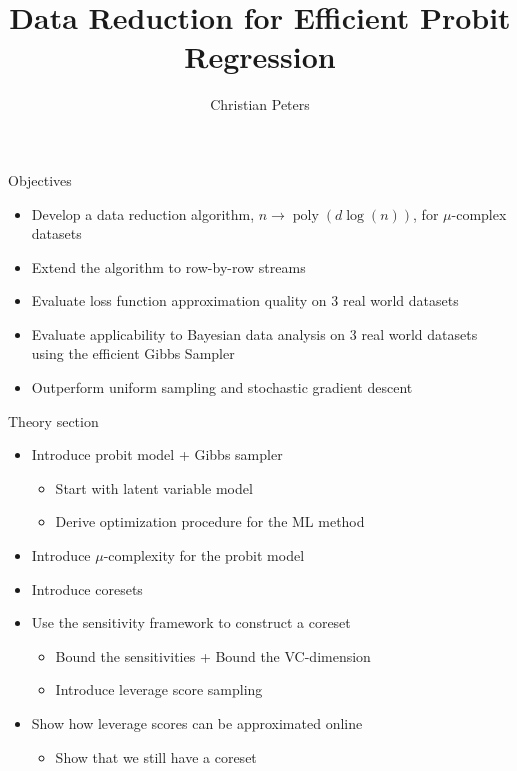 \documentclass[gray]{beamer}
\title{Data Reduction for Efficient Probit Regression}
\author{Christian Peters}
\begin{document}
\maketitle

\begin{frame}{Objectives}
    \begin{itemize}
        \item Develop a data reduction algorithm, $n \rightarrow \operatorname{poly}(d \log(n))$,
              for $\mu$-complex datasets
        \item Extend the algorithm to row-by-row streams
        \item Evaluate loss function approximation quality on 3 real world datasets
        \item Evaluate applicability to Bayesian data analysis on 3 real world datasets
              using the efficient Gibbs Sampler
        \item Outperform uniform sampling and stochastic gradient descent
    \end{itemize}
\end{frame}

\begin{frame}{Theory section}
    \begin{itemize}
        \item Introduce probit model + Gibbs sampler
              \begin{itemize}
                  \item Start with latent variable model
                  \item Derive optimization procedure for the ML method
              \end{itemize}
        \item Introduce $\mu$-complexity for the probit model
        \item Introduce coresets
        \item Use the sensitivity framework to construct a coreset
              \begin{itemize}
                  \item Bound the sensitivities + Bound the VC-dimension
                  \item Introduce leverage score sampling
              \end{itemize}
        \item Show how leverage scores can be approximated online
              \begin{itemize}
                  \item Show that we still have a coreset
              \end{itemize}
    \end{itemize}
\end{frame}
\end{document}
